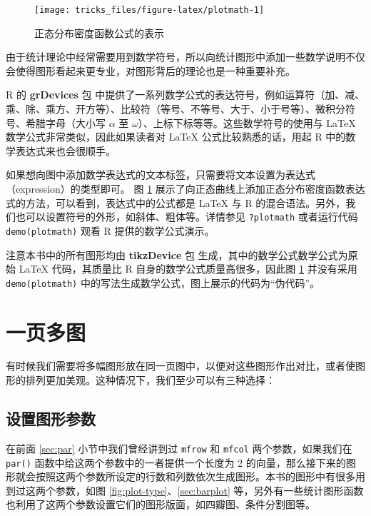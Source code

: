 \documentclass[
  b5paper,
  UTF8,twoside]{book}
\begin{document}
\begin{figure}

{\centering \texttt{[image: tricks\_files/figure-latex/plotmath-1]} 

}

\caption{正态分布密度函数公式的表示}\label{fig:plotmath}
\end{figure}

由于统计理论中经常需要用到数学符号，所以向统计图形中添加一些数学说明不仅会使得图形看起来更专业，对图形背后的理论也是一种重要补充。

R 的 \textbf{grDevices} 包 中提供了一系列数学公式的表达符号，例如运算符（加、减、乘、除、乘方、开方等）、比较符（等号、不等号、大于、小于号等）、微积分符号、希腊字母（大小写 \(\alpha\) 至 \(\omega\)）、上标下标等等。这些数学符号的使用与 LaTeX 数学公式非常类似，因此如果读者对 LaTeX 公式比较熟悉的话，用起 R 中的数学表达式来也会很顺手。

如果想向图中添加数学表达式的文本标签，只需要将文本设置为表达式（expression）的类型即可。 图 \ref{fig:plotmath} 展示了向正态曲线上添加正态分布密度函数表达式的方法，可以看到，表达式中的公式都是 LaTeX 与 R 的混合语法。另外，我们也可以设置符号的外形，如斜体、粗体等。详情参见 \texttt{?plotmath} 或者运行代码 \texttt{demo(plotmath)} 观看 R 提供的数学公式演示。

注意本书中的所有图形均由 \textbf{tikzDevice} 包 \citep{tikzDevice} 生成，其中的数学公式数学公式为原始 LaTeX 代码，其质量比 R 自身的数学公式质量高很多，因此图 \ref{fig:plotmath} 并没有采用 \texttt{demo(plotmath)} 中的写法生成数学公式，图上展示的代码为``伪代码''。

\section{一页多图}\label{sec:multipage}

有时候我们需要将多幅图形放在同一页图中，以便对这些图形作出对比，或者使图形的排列更加美观。这种情况下，我们至少可以有三种选择：

\subsection{设置图形参数}\label{ux8bbeux7f6eux56feux5f62ux53c2ux6570}

在前面 \ref{sec:par} 小节中我们曾经讲到过 \texttt{mfrow} 和 \texttt{mfcol} 两个参数，如果我们在 \texttt{par()} 函数中给这两个参数中的一者提供一个长度为 2 的向量，那么接下来的图形就会按照这两个参数所设定的行数和列数依次生成图形。本书的图形中有很多用到过这两个参数，如图 \ref{fig:plot-type}、\ref{sec:barplot} 等，另外有一些统计图形函数也利用了这两个参数设置它们的图形版面，如四瓣图、条件分割图等。
\end{document}

